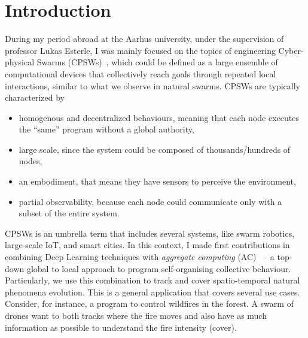 \documentclass{article}
\begin{document}
\section{Introduction}
During my period abroad at the Aarhus university, under the supervision of professor Lukas Esterle, 
 I was mainly focused on the topics of engineering Cyber-physical Swarms (CPSWs)~\cite{aguzzi2021research}, which could be defined as a
 large ensemble of computational devices that collectively reach goals through repeated local interactions, similar to what we observe in natural swarms. 
CPSWs are typically characterized by 
\begin{itemize}
\item homogenous and decentralized behaviours, meaning that each node executes the ``same'' program without a global authority,
\item large scale, since the system could be composed of thousands/hundreds of nodes, 
\item an embodiment, that means they have sensors to perceive the environment,
\item partial observability, because each node could communicate only with a subset of the entire system.
\end{itemize}
CPSWs is an umbrella term that includes several systems, 
like swarm robotics, large-scale IoT, and smart cities.
%
In this context, I made first contributions in combining Deep Learning techniques with \textit{aggregate computing} (AC)~\cite{beal2015aggregate}
 -- a top-down global to local approach to program self-organising collective behaviour.
Particularly, we use this combination to track and cover spatio-temporal natural phenomena evolution. 
%
This is a general application that covers several use cases. 
 Consider, for instance, a program to control wildfires in the forest. 
 A swarm of drones want to both tracks where the fire moves and also have as much information as possible to understand the fire intensity (cover).
%
 
\end{document}

